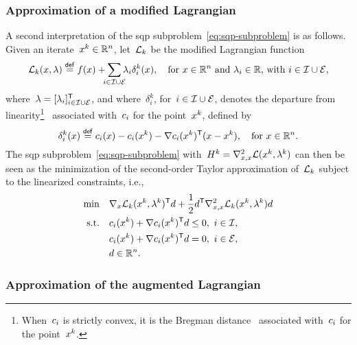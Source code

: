\subsubsection{Approximation of a modified Lagrangian}

A second interpretation of the \gls{sqp} subproblem~\cref{eq:sqp-subproblem} is as follows.
Given an iterate~$\iter[k] \in \R^n$, let~$\lag[k]$ be the modified Lagrangian function
\begin{equation*}
    \lag[k](\iter, \lm) \eqdef \obj(\iter) + \sum_{\mathclap{i \in \iub \cup \ieq}} \lm_i \delta_i^k(\iter), \quad \text{for~$\iter \in \R^n$ and~$\lm_i \in \R$, with~$i \in \iub \cup \ieq$},
\end{equation*}
where~$\lm = [\lm_i]_{i \in \iub \cup \ieq}^{\T}$, and where~$\delta_i^k$, for~$i \in \mathcal{I} \cup \mathcal{E}$, denotes the departure from linearity\footnote{When~$c_{i}$ is strictly convex, it is the Bregman distance~\cite{Bregman_1967} associated with~$c_{i}$ for the point~$\iter[k]$.}~\cite{Robinson_1972a,Hoek_1982} associated with~$c_{i}$ for the point~$\iter[k]$, defined by
\begin{equation*}
    \delta_i^k(\iter) \eqdef \con{i}(\iter) - \con{i}(\iter[k]) - \nabla \con{i}(\iter[k])^{\T} (\iter - \iter[k]), \quad \text{for~$\iter \in \R^n$.}
\end{equation*}
The \gls{sqp} subproblem~\cref{eq:sqp-subproblem} with~$H^k = \nabla_{x, x}^2 \lag(\iter[k], \lm[k])$ can then be seen as the minimization of the second-order Taylor approximation of~$\lag[k]$ subject to the linearized constraints, i.e.,
\begin{align*}
    \min        & \quad \nabla_x \lag[k](\iter[k], \lm[k])^{\T} \step + \frac{1}{2} \step^{\T} \nabla_{x, x}^2 \lag[k](\iter[k], \lm[k]) \step\\
    \text{s.t.} & \quad \con{i}(\iter[k]) + \nabla \con{i}(\iter[k])^{\T} \step \le 0, ~ i \in \iub,\\
                & \quad \con{i}(\iter[k]) + \nabla \con{i}(\iter[k])^{\T} \step = 0, ~ i \in \ieq,\\
                & \quad \step \in \R^n.
\end{align*}

\subsubsection{Approximation of the augmented Lagrangian}


